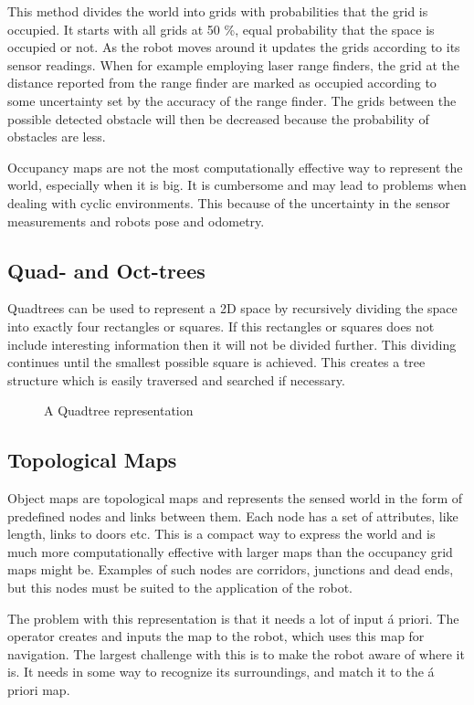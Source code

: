 This method divides the world into grids with probabilities that the grid is occupied. It
starts with all grids at 50 \%, equal probability that the space is occupied or not. As
the robot moves around it updates the grids according to its sensor readings. When for
example employing laser range finders, the grid at the distance reported from the range
finder are marked as occupied according to some uncertainty set by the accuracy of the
range finder. The grids between the possible detected obstacle will then be decreased
because the probability of obstacles are less. 

Occupancy maps are not the most computationally effective way to represent the world,
especially when it is big. It is cumbersome and may lead to problems when dealing with
cyclic environments. This because of the uncertainty in the sensor measurements and robots
pose and odometry. 


\subsection{Quad- and Oct-trees}
Quadtrees can be used to represent a 2D space by recursively dividing the space into
exactly four rectangles or squares. If this rectangles or squares does not include
interesting information then it will not be divided further. This dividing continues until
the smallest possible square is achieved. This creates a tree structure which is easily
traversed and searched if necessary. 

\begin{figure}[htbp]
    \centering
    \caption{A Quadtree representation}
    \label{chap2:fig-quadtree}
\end{figure}


\subsection{Topological Maps}
Object maps are topological maps and represents the sensed world in the form of predefined nodes and links
between them. Each node has a set of attributes, like length, links to doors etc. This is
a compact way to express the world and is much more computationally effective with larger
maps than the occupancy grid maps might be. Examples of such nodes are corridors,
junctions and dead ends, but this nodes must be suited to the application of the robot. 

The problem with this representation is that it needs a lot of input \'a priori. The
operator creates and inputs the map to the robot, which uses this map for navigation. The
largest challenge with this is to make the robot aware of where it is. It needs in some
way to recognize its surroundings, and match it to the \'a priori map.


